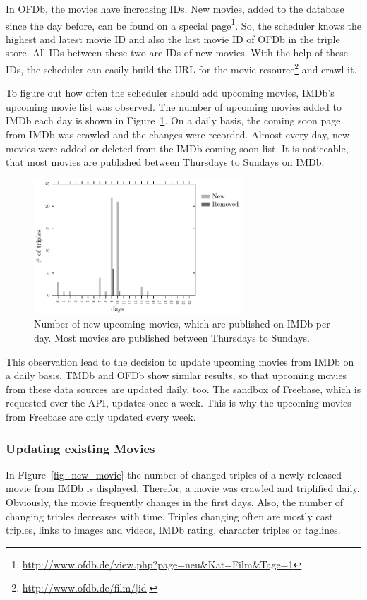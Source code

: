 In OFDb, the movies have increasing IDs.
New movies, added to the database since the day before, can be found on a special page\footnote{\url{http://www.ofdb.de/view.php?page=neu&Kat=Film&Tage=1}}.
So, the scheduler knows the highest and latest movie ID and also the last movie ID of OFDb in the triple store.
All IDs between these two are IDs of new movies.
With the help of these IDs, the scheduler can easily build the URL for the movie resource\footnote{\url{http://www.ofdb.de/film/[id]}} and crawl it.

To figure out how often the scheduler should add upcoming movies, IMDb's upcoming movie list was observed.
The number of upcoming movies added to IMDb each day is shown in Figure~\ref{fig_coming_soon_movie}.
On a daily basis, the coming soon page from IMDb was crawled and the changes were recorded.
Almost every day, new movies were added or deleted from the IMDb coming soon list.
It is noticeable, that most movies are published between Thursdays to Sundays on IMDb.

\begin{figure}[h!]
  \begin{center}
  \includegraphics[width=0.7\textwidth]{images/updating_1.pdf}
  \end{center}
  \caption{Number of new upcoming movies, which are published on IMDb per day. Most movies are published between Thursdays to Sundays.}
  \label{fig_coming_soon_movie}
\end{figure}

This observation lead to the decision to update upcoming movies from IMDb on a daily basis.
TMDb and OFDb show similar results, so that upcoming movies from these data sources are updated daily, too.
The sandbox of Freebase, which is requested over the API, updates once a week.
This is why the upcoming movies from Freebase are only updated every week.

\subsubsection{Updating existing Movies}
In Figure~\ref{fig_new_movie} the number of changed triples of a newly released movie from IMDb is displayed.
Therefor, a movie was crawled and triplified daily.
Obviously, the movie frequently changes in the first days.
Also, the number of changing triples decreases with time.
Triples changing often are mostly cast triples, links to images and videos, IMDb rating, character triples or taglines.

